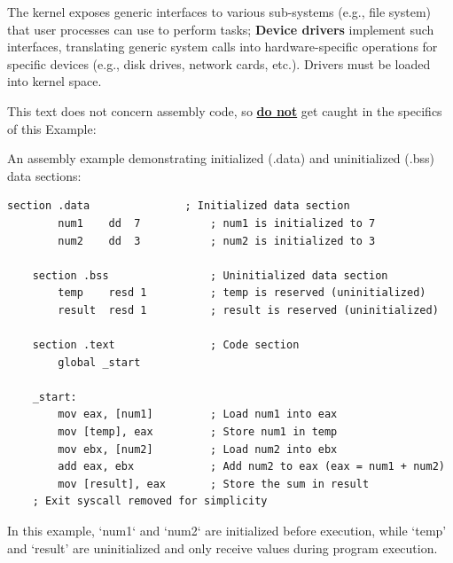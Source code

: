 \begin{Def}

  The kernel exposes generic interfaces to various sub-systems (e.g., file system) that user processes can use to perform tasks; \textbf{Device drivers} implement such interfaces,
  translating generic system calls into hardware-specific operations for specific devices (e.g., disk drives, network cards, etc.). Drivers must be loaded into kernel space.
\end{Def}

\noindent
This text does not concern assembly code, so \underline{\textbf{do not}} get caught in the specifics of this Example: 
\begin{Example}

    \label{ex:assembly_code}
    An assembly example demonstrating initialized (.data) and uninitialized (.bss) data sections:

    \begin{lstlisting}[language={[x86masm]Assembler}, numbers=none]
    section .data               ; Initialized data section
        num1    dd  7           ; num1 is initialized to 7
        num2    dd  3           ; num2 is initialized to 3

    section .bss                ; Uninitialized data section
        temp    resd 1          ; temp is reserved (uninitialized)
        result  resd 1          ; result is reserved (uninitialized)

    section .text               ; Code section
        global _start

    _start:
        mov eax, [num1]         ; Load num1 into eax
        mov [temp], eax         ; Store num1 in temp
        mov ebx, [num2]         ; Load num2 into ebx
        add eax, ebx            ; Add num2 to eax (eax = num1 + num2)
        mov [result], eax       ; Store the sum in result
    ; Exit syscall removed for simplicity
    \end{lstlisting}

    \noindent
    In this example, `num1` and `num2` are initialized before execution, while `temp' and `result' are uninitialized and only receive values during program execution.
\end{Example}